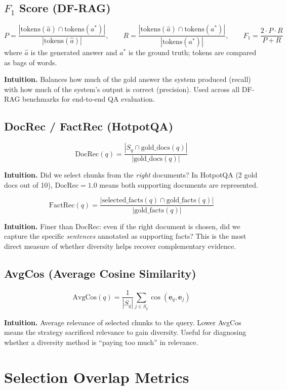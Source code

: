 \documentclass[11pt,a4paper]{article}
\begin{document}
\subsection{$F_1$ Score (DF-RAG)}

\[
	P = \frac{|\text{tokens}(\hat{a}) \cap \text{tokens}(a^*)|}{|\text{tokens}(\hat{a})|}, \qquad
	R = \frac{|\text{tokens}(\hat{a}) \cap \text{tokens}(a^*)|}{|\text{tokens}(a^*)|}, \qquad
	F_1 = \frac{2 \cdot P \cdot R}{P + R}
\]
where $\hat{a}$ is the generated answer and $a^*$ is the ground truth; tokens are compared as bags of words.

\textbf{Intuition.} Balances how much of the gold answer the system produced (recall) with how much of the system's output is correct (precision). Used across all DF-RAG benchmarks for end-to-end QA evaluation.

\subsection{DocRec / FactRec (HotpotQA)}

\[
	\mathrm{DocRec}(q) = \frac{|S_q \cap \mathrm{gold\_docs}(q)|}{|\mathrm{gold\_docs}(q)|}
\]

\textbf{Intuition.} Did we select chunks from the \emph{right} documents? In HotpotQA (2 gold docs out of 10), $\mathrm{DocRec}=1.0$ means both supporting documents are represented.

\[
	\mathrm{FactRec}(q) = \frac{|\mathrm{selected\_facts}(q) \cap \mathrm{gold\_facts}(q)|}{|\mathrm{gold\_facts}(q)|}
\]

\textbf{Intuition.} Finer than DocRec: even if the right document is chosen, did we capture the specific \emph{sentences} annotated as supporting facts? This is the most direct measure of whether diversity helps recover complementary evidence.

\subsection{AvgCos (Average Cosine Similarity)}

\[
	\mathrm{AvgCos}(q) = \frac{1}{|S_q|} \sum_{j \in S_q} \cos(\mathbf{e}_q, \mathbf{e}_j)
\]

\textbf{Intuition.} Average relevance of selected chunks to the query. Lower AvgCos means the strategy sacrificed relevance to gain diversity. Useful for diagnosing whether a diversity method is ``paying too much'' in relevance.

\section{Selection Overlap Metrics}
\end{document}
